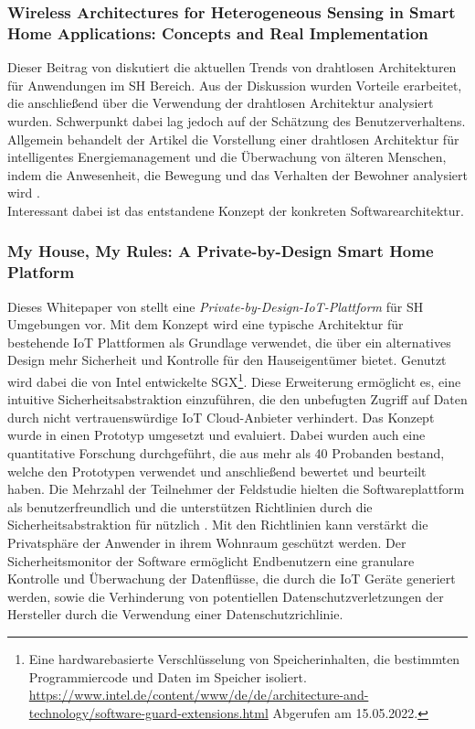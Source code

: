         \subsubsection*{Wireless Architectures for Heterogeneous Sensing in Smart Home Applications: Concepts and Real Implementation}
            Dieser Beitrag von \cite{Viani2013} diskutiert die aktuellen Trends von drahtlosen Architekturen für Anwendungen 
            im \acl{SH} Bereich. Aus der Diskussion wurden Vorteile erarbeitet, die anschließend über die Verwendung der 
            drahtlosen Architektur analysiert wurden. Schwerpunkt dabei lag jedoch auf der Schätzung des Benutzerverhaltens. 
            \\
            \linebreak
            Allgemein behandelt der Artikel die Vorstellung einer drahtlosen Architektur für intelligentes Energiemanagement 
            und die Überwachung von älteren Menschen, indem die Anwesenheit, die Bewegung und das Verhalten der Bewohner 
            analysiert wird \cite{Viani2013}. 
            \\
            Interessant dabei ist das entstandene Konzept der konkreten Softwarearchitektur.

        \subsubsection*{My House, My Rules: A Private-by-Design Smart Home Platform}
            Dieses Whitepaper von \cite{Zavalyshyn2020} stellt eine \textit{Private-by-Design-IoT-Plattform} für \acl{SH} 
            Umgebungen vor. Mit dem Konzept wird eine typische Architektur für bestehende \acs{IoT} Plattformen als Grundlage 
            verwendet, die über ein alternatives Design mehr Sicherheit und Kontrolle für den Hauseigentümer bietet. 
            Genutzt wird dabei die von Intel entwickelte \ac{SGX}\footnote{Eine hardwarebasierte Verschlüsselung von Speicherinhalten, die bestimmten Programmiercode und Daten im Speicher isoliert. \url{https://www.intel.de/content/www/de/de/architecture-and-technology/software-guard-extensions.html} Abgerufen am 15.05.2022.}. 
            Diese Erweiterung ermöglicht es, eine intuitive Sicherheitsabstraktion einzuführen, die den unbefugten Zugriff auf Daten 
            durch nicht vertrauenswürdige \acs{IoT} Cloud-Anbieter verhindert. Das Konzept wurde in einen Prototyp umgesetzt und 
            evaluiert. Dabei wurden auch eine quantitative Forschung durchgeführt, die aus mehr als 40 Probanden bestand, welche 
            den Prototypen verwendet und anschließend bewertet und beurteilt haben. Die Mehrzahl der Teilnehmer der Feldstudie 
            hielten die Softwareplattform als benutzerfreundlich und die unterstützen Richtlinien durch die Sicherheitsabstraktion 
            für nützlich \cite{Zavalyshyn2020}. Mit den Richtlinien kann verstärkt die Privatsphäre der Anwender in ihrem Wohnraum 
            geschützt werden. Der Sicherheitsmonitor der Software ermöglicht Endbenutzern eine granulare Kontrolle und Überwachung 
            der Datenflüsse, die durch die \acs{IoT} Geräte generiert werden, sowie die Verhinderung von potentiellen 
            Datenschutzverletzungen der Hersteller durch die Verwendung einer Datenschutzrichlinie. 

